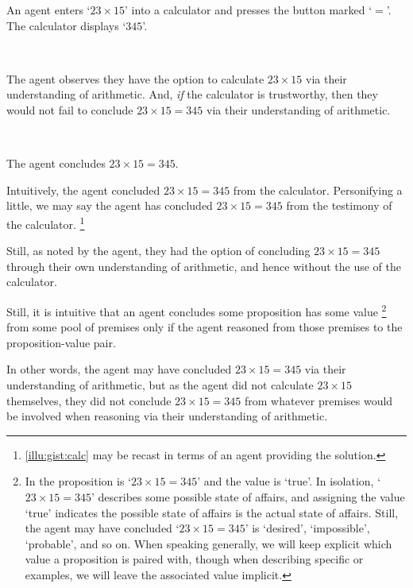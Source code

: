 \begin{note}
  \begin{scenario}[Multiplication]
    \label{illu:gist:calc}
    An agent enters `\(23 \times 15\)' into a calculator and presses the button marked `\(=\)'.
    The calculator displays `\(345\)'.

    \mbox{ }

    The agent observes they have the option to calculate \(23 \times 15\) via their understanding of arithmetic.
    And, \emph{if} the calculator is trustworthy, then they would not fail to conclude \(23 \times 15 = 345\) via their understanding of arithmetic.

    \mbox{ }

    The agent concludes \(23 \times 15 = 345\).
  \end{scenario}

  Intuitively, the agent concluded \(23 \times 15 = 345\) from the calculator.
  Personifying a little, we may say the agent has concluded \(23 \times 15 = 345\) from the testimony of the calculator.%
  \footnote{
    \autoref{illu:gist:calc} may be recast in terms of an agent providing the solution.
  }

  Still, as noted by the agent, they had the option of concluding \(23 \times 15 = 345\) through their own understanding of arithmetic, and hence without the use of the calculator.

  Still, it is intuitive that an agent concludes some proposition has some value%
  \footnote{In  the proposition is `\(23 \times 15 = 345\)' and the value is `true'.
    In isolation, `\(23 \times 15 = 345\)' describes some possible state of affairs, and assigning the value `true' indicates the possible state of affairs is the actual state of affairs.
    Still, the agent may have concluded `\(23 \times 15 = 345\)' is `desired', `impossible', `probable', and so on.
    When speaking generally, we will keep explicit which value a proposition is paired with, though when describing specific  or examples, we will leave the associated value implicit.
  }
  from some pool of premises only if the agent reasoned from those premises to the proposition-value pair.

  In other words, the agent may have concluded \(23 \times 15 = 345\) via their understanding of arithmetic, but as the agent did not calculate \(23 \times 15\) themselves, they did not conclude \(23 \times 15 = 345\) from whatever premises would be involved when reasoning via their understanding of arithmetic.


\end{note}
